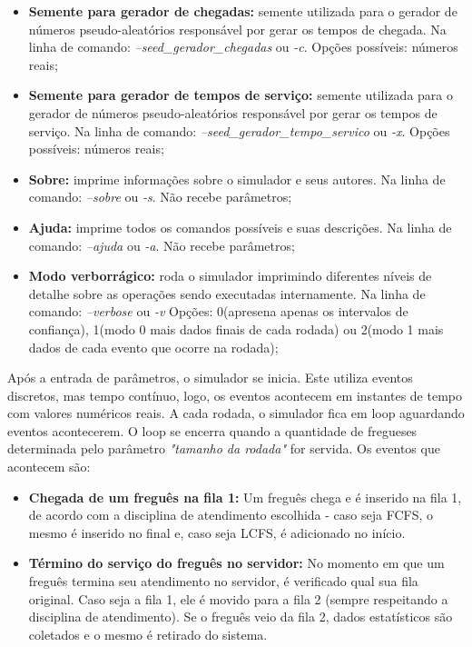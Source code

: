 \documentclass[a4paper,10pt]{article}
\begin{document}
\begin {itemize}
\item \textbf{Semente para gerador de chegadas:} semente utilizada para o gerador de números pseudo-aleatórios responsável por gerar os tempos de chegada. Na linha de comando: \emph{--seed\_gerador\_chegadas} ou \emph{-c}. Opções possíveis: números reais;

\item \textbf{Semente para gerador de tempos de serviço:} semente utilizada para o gerador de números pseudo-aleatórios responsável por gerar os tempos de serviço. Na linha de comando: \emph{--seed\_gerador\_tempo\_servico} ou \emph{-x}. Opções possíveis: números reais;

\item \textbf{Sobre:} imprime informações sobre o simulador e seus autores. Na linha de comando: \emph{--sobre} ou \emph{-s}. Não recebe parâmetros;

\item \textbf{Ajuda:} imprime todos os comandos possíveis e suas descrições. Na linha de comando: \emph{--ajuda} ou \emph{-a}. Não recebe parâmetros;

\item \textbf{Modo verborrágico:} roda o simulador imprimindo diferentes níveis de detalhe sobre as operações sendo executadas internamente. Na linha de comando: \emph{--verbose} ou \emph{-v} Opções: 0(apresena apenas os intervalos de confiança), 1(modo 0 mais dados finais de cada rodada) ou 2(modo 1 mais dados de cada evento que ocorre na rodada);
\end {itemize}

    Após a entrada de parâmetros, o simulador se inicia. Este utiliza eventos discretos, mas tempo contínuo, logo, os eventos acontecem em instantes de tempo com valores numéricos reais. A cada rodada, o simulador fica em loop aguardando eventos acontecerem. O loop se encerra quando a quantidade de fregueses determinada pelo parâmetro \emph{"tamanho da rodada"} for servida. Os eventos que acontecem são:

\begin {itemize}
\item \textbf{Chegada de um freguês na fila 1:} Um freguês chega e é inserido na fila 1, de acordo com a disciplina de atendimento escolhida - caso seja FCFS, o mesmo é inserido no final e, caso seja LCFS, é adicionado no início.

\item \textbf{Término do serviço do freguês no servidor:} No momento em que um freguês termina seu atendimento no servidor, é verificado qual sua fila original. Caso seja a fila 1,
ele é movido para a fila 2 (sempre respeitando a disciplina de atendimento). Se o freguês veio da fila 2, dados estatísticos são coletados e o mesmo é retirado do sistema.
\end {itemize}
\end{document}
